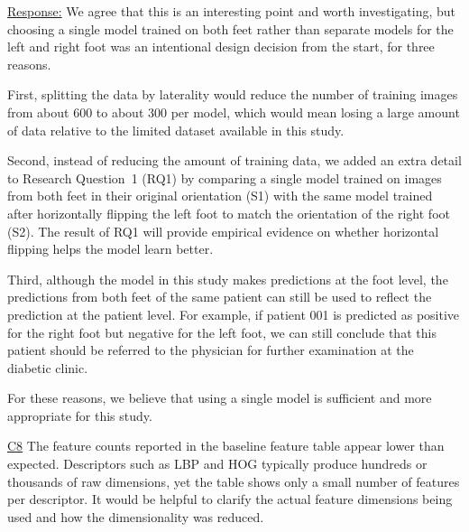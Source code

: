 \documentclass[12pt,a4paper]{article}
\newcommand{\cid}[1]{{\color{cidred}\underline{#1}}}
\newcommand{\mref}[1]{%
  \marginnote{%
    \color{respblue}\scriptsize
    \rule[-0.3ex]{0.6pt}{1.4ex}\hspace{4pt}%
    \parbox[t]{2.4cm}{\raggedright #1}%
  }%
}
\newenvironment{response}{%
  \par\color{respblue}%
}{\par}
\begin{document}
\mref{\S~1.3\\Research\\Questions\\[4pt]\S~3.7\\Evaluation\\Plan}
\begin{response}
\underline{Response:} We agree that this is an interesting point and worth investigating, but choosing a single model trained on both feet rather than separate models for the left and right foot was an intentional design decision from the start, for three reasons.

First, splitting the data by laterality would reduce the number of training images from about 600 to about 300 per model, which would mean losing a large amount of data relative to the limited dataset available in this study.

Second, instead of reducing the amount of training data, we added an extra detail to Research Question~1 (RQ1) by comparing a single model trained on images from both feet in their original orientation (S1) with the same model trained after horizontally flipping the left foot to match the orientation of the right foot (S2). The result of RQ1 will provide empirical evidence on whether horizontal flipping helps the model learn better.

Third, although the model in this study makes predictions at the foot level, the predictions from both feet of the same patient can still be used to reflect the prediction at the patient level. For example, if patient 001 is predicted as positive for the right foot but negative for the left foot, we can still conclude that this patient should be referred to the physician for further examination at the diabetic clinic.

For these reasons, we believe that using a single model is sufficient and more appropriate for this study.
\end{response}

\cid{C8} The feature counts reported in the baseline feature table appear lower than expected. Descriptors such as LBP and HOG typically produce hundreds or thousands of raw dimensions, yet the table shows only a small number of features per descriptor. It would be helpful to clarify the actual feature dimensions being used and how the dimensionality was reduced.
\end{document}
